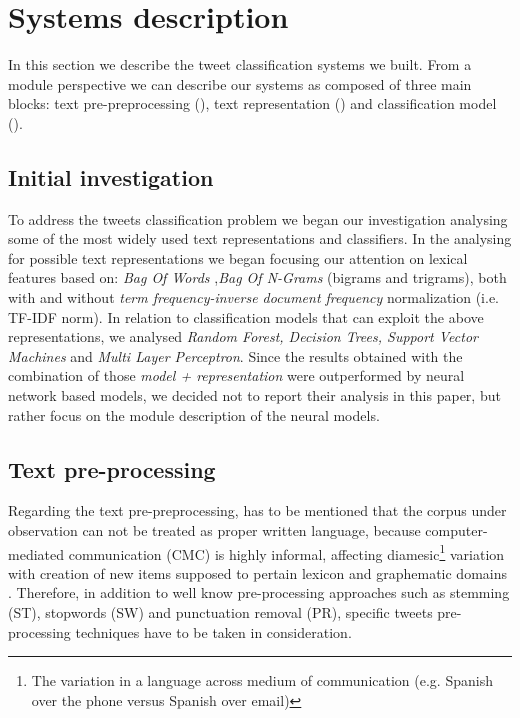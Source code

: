 \section{Systems description} \label{sec:system}

In this section we describe the tweet classification systems we built. From a module perspective we can describe our systems as composed of three main blocks: text pre-preprocessing (),  text representation () and classification model (). 


\subsection{Initial investigation} \label{subsec:boh}
To address the tweets classification problem we began our investigation analysing some of the most widely used text representations and classifiers.
In the analysing for possible text representations we began focusing our attention on lexical features based on: \emph{Bag Of Words} \cite{harris1954distributional},\emph{Bag Of N-Grams} (bigrams and trigrams), both with and without \emph{term frequency-inverse document frequency} normalization (i.e. TF-IDF norm).
In relation to classification models that can exploit the above representations,  we analysed \emph{Random Forest, Decision Trees, Support Vector Machines} and \emph{Multi Layer Perceptron}. Since the results obtained with the combination of those \emph{model + representation} were outperformed by neural network based models, we decided not to report their analysis in this paper, but rather focus on the module description of the neural models.


\subsection{Text pre-processing} \label{subsec:preprocessing}
Regarding the text pre-preprocessing, has to be mentioned that the corpus under observation can not be treated as proper written language, because computer-mediated communication (CMC) is highly informal, affecting diamesic\footnote{The variation in a language across medium of communication (e.g. Spanish over the phone versus Spanish over email)} variation with creation of new items supposed to pertain lexicon and graphematic domains \cite{bazzanella2011oscillazioni,cerruti2013netspeak}.
Therefore, in addition to well know pre-processing approaches such as stemming (ST), stopwords (SW) and punctuation removal (PR), specific tweets pre-processing techniques have to be taken in consideration.

